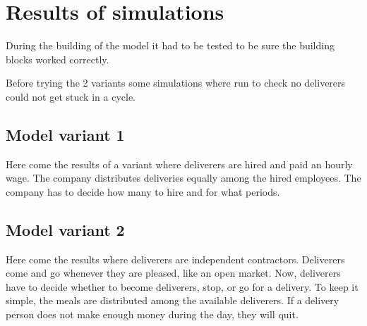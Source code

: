 \section{Results of simulations}\label{sec:results-of-simulations}
During the building of the model it had to be tested to be sure the building blocks worked correctly.

Before trying the 2 variants some simulations where run to check no deliverers could not get stuck in a cycle.








\subsection{Model variant 1}
Here come the results of a variant where deliverers are hired and paid an hourly wage.
The company distributes deliveries equally among the hired employees.
The company has to decide how many to hire and for what periods.


\subsection{Model variant 2}
Here come the results where deliverers are independent contractors.
Deliverers come and go whenever they are pleased, like an open market.
Now, deliverers have to decide whether to become deliverers, stop, or go for a delivery.
To keep it simple, the meals are distributed among the available deliverers.
If a delivery person does not make enough money during the day, they will quit.